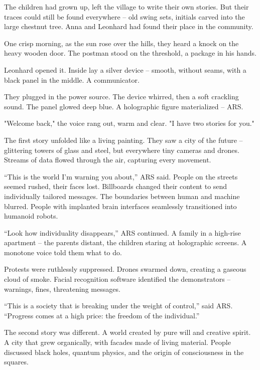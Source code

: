 \documentclass[
]{article}
\begin{document}
The children had grown up, left the village to write their own stories. But their traces could still be found everywhere -- old swing sets, initials carved into the large chestnut tree. Anna and Leonhard had found their place in the community.

One crisp morning, as the sun rose over the hills, they heard a knock on the heavy wooden door. The postman stood on the threshold, a package in his hands.

Leonhard opened it. Inside lay a silver device -- smooth, without seams, with a black panel in the middle. A communicator.

They plugged in the power source. The device whirred, then a soft crackling sound. The panel glowed deep blue. A holographic figure materialized -- ARS.

"Welcome back," the voice rang out, warm and clear. "I have two stories for you."

The first story unfolded like a living painting. They saw a city of the future -- glittering towers of glass and steel, but everywhere tiny cameras and drones. Streams of data flowed through the air, capturing every movement.

``This is the world I'm warning you about,'' ARS said. People on the streets seemed rushed, their faces lost. Billboards changed their content to send individually tailored messages. The boundaries between human and machine blurred. People with implanted brain interfaces seamlessly transitioned into humanoid robots.

``Look how individuality disappears,'' ARS continued. A family in a high-rise apartment -- \hspace{0pt}\hspace{0pt}the parents distant, the children staring at holographic screens. A monotone voice told them what to do.

Protests were ruthlessly suppressed. Drones swarmed down, creating a gaseous cloud of smoke. Facial recognition software identified the demonstrators -- warnings, fines, threatening messages.

``This is a society that is breaking under the weight of control,'' said ARS. ``Progress comes at a high price: the freedom of the individual.''

The second story was different. A world created by pure will and creative spirit. A city that grew organically, with facades made of living material. People discussed black holes, quantum physics, and the origin of consciousness in the squares.
\end{document}
